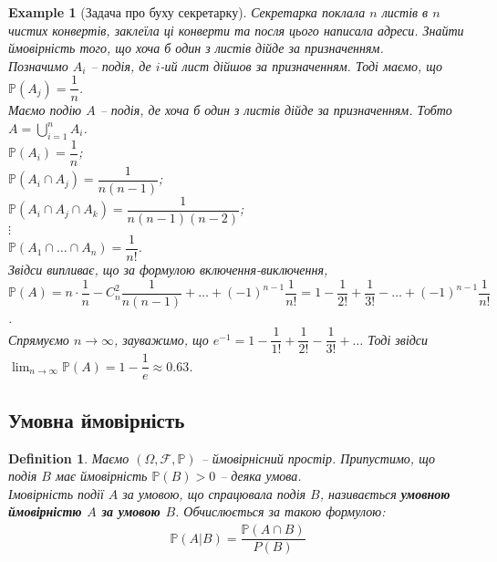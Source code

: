 \documentclass[a4paper, 10pt]{article}
\theoremstyle{theoremdd}
\newtheorem{definition}[theorem]{Definition}
\newtheorem{example}[theorem]{Example}
\begin{document}
\begin{example}[Задача про буху секретарку]
Секретарка поклала $n$ листів в $n$ чистих конвертів, заклеїла ці конверти та посля цього написала адреси. Знайти ймовірність того, що хоча б один з листів дійде за призначенням.\\
Позначимо $A_i$ -- подія, де $i$-ий лист дійшов за призначенням. Тоді маємо, що $\mathbb{P}(A_j) = \dfrac{1}{n}$.\\
Маємо подію $A$ -- подія, де хоча б один з листів дійде за призначенням. Тобто $A = \displaystyle\bigcup_{i=1}^n A_i$.\\
$\mathbb{P}(A_i) = \dfrac{1}{n}$;\\
$\mathbb{P}(A_i \cap A_j) = \dfrac{1}{n(n-1)}$;\\
$\mathbb{P}(A_i \cap A_j \cap A_k) = \dfrac{1}{n(n-1)(n-2)}$;\\
$\vdots$\\
$\mathbb{P}(A_1 \cap \dots \cap A_n) = \dfrac{1}{n!}$.\\
Звідси випливає, що за формулою включення-виключення,\\
$\mathbb{P}(A) = n \cdot \dfrac{1}{n} - C_n^2 \dfrac{1}{n(n-1)} + \dots + (-1)^{n-1} \dfrac{1}{n!} = 1 - \dfrac{1}{2!} + \dfrac{1}{3!} - \dots + (-1)^{n-1} \dfrac{1}{n!}$.\\
Спрямуємо $n \to \infty$, зауважимо, що $e^{-1} = 1 - \dfrac{1}{1!} + \dfrac{1}{2!} - \dfrac{1}{3!} + \dots$ Тоді звідси $\displaystyle\lim_{n \to \infty} \mathbb{P}(A) = 1 - \dfrac{1}{e} \approx 0.63$.
\end{example}

\subsection{Умовна ймовірність}
\begin{definition}
Маємо $(\Omega, \mathcal{F}, \mathbb{P})$ -- ймовірнісний простір. Припустимо, що подія $B$ має ймовірність $\mathbb{P}(B) > 0$ -- деяка умова.\\
Імовірність події $A$ за умовою, що спрацювала подія $B$, називається \textbf{умовною ймовірністю $A$ за умовою $B$}. Обчислюється за такою формулою:
\begin{align*}
\mathbb{P}(A|B) = \dfrac{\mathbb{P}(A \cap B)}{P(B)}
\end{align*}
\end{definition}
\end{document}
